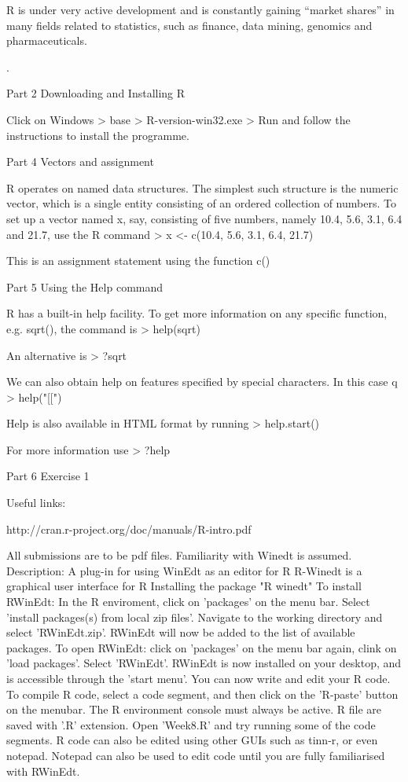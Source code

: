 R is under very active development and is constantly gaining “market shares” in many fields related to statistics, such as finance, data mining, genomics and pharmaceuticals.
 
.

Part 2 Downloading and Installing R

Click on
Windows > base > R-version-win32.exe > Run
and follow the instructions to install the programme.


Part 4 Vectors and assignment

R operates on named data structures. The simplest such structure is the numeric vector, which is a single entity consisting of an ordered collection of numbers. To set up a vector
named x, say, consisting of five numbers, namely 10.4, 5.6, 3.1, 6.4 and 21.7, use the R command
> x <- c(10.4, 5.6, 3.1, 6.4, 21.7)

This is an assignment statement using the function c()

Part 5 Using the Help command

R has a built-in help facility. To get more information on any specific function, e.g. sqrt(), the command is
> help(sqrt)

An alternative is
> ?sqrt

We can also obtain help on features specified by special characters. In this case q
> help("[[")

Help is also available in HTML format by running
> help.start()

For more information use
> ?help



Part 6 Exercise 1




Useful links:

http://cran.r-project.org/doc/manuals/R-intro.pdf
 
 
 
All submissions are to be pdf files.
Familiarity with Winedt is assumed.
Description: A plug-in for using WinEdt as an editor for R
R-Winedt is a graphical user interface for R
Installing the package "R winedt"
To install RWinEdt:
In the R enviroment, click on 'packages' on the menu bar.
Select 'install packages(s) from local zip files'.
Navigate to the working directory and select 'RWinEdt.zip'.
RWinEdt will now be added to the list of available packages.
To open RWinEdt:
click on 'packages' on the menu bar again,
clink on 'load packages'.
Select 'RWinEdt'.
RWinEdt is now installed on your desktop, and is accessible through the 'start menu'.
You can now write and edit your R code.
To compile R code, select a code segment, and then click on the 'R-paste' button
on the menubar. The R environment console must always be active.
R file are saved with '.R' extension.
Open 'Week8.R' and try running some of the code segments.
R code can also be edited using other GUIs such as tinn-r, or even notepad.
Notepad can also be used to edit code until you are fully familiarised with RWinEdt.

